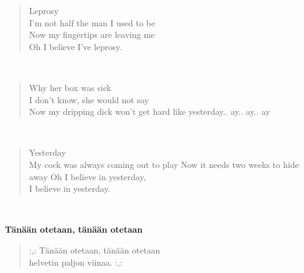 \noindent\begin{minipage}{\linewidth}
\begin{verse}
	Leprosy\\
	I'm not half the man I used to be\\
	Now my fingertips are leaving me\\
	Oh I believe I've leprosy.\\
\end{verse}
\end{minipage}\\[10pt]
\noindent\begin{minipage}{\linewidth}
\begin{verse}
	Why her box was sick\\
	I don't know, she would not say\\
	Now my dripping dick won't get hard like yesterday.. ay.. ay.. ay\\
\end{verse}
\end{minipage}\\[10pt]
\noindent\begin{minipage}{\linewidth}
\begin{verse}
	Yesterday\\
	My cock was always coming out to play Now it needs two weeks to hide away Oh I believe in yesterday,\\
	I believe in yesterday.\\
\end{verse}
\end{minipage}\\[10pt]
%
%
\noindent\begin{minipage}{\linewidth}
\vspace{5pt}
\parbox[t]{0.85\linewidth}{\raggedright {\large\bf Tänään otetaan, tänään otetaan}\\[6pt]}
\begin{verse}
	\hspace{0pt-\widthof{:,: }}:,: Tänään otetaan, tänään otetaan\\
	helvetin paljon viinaa. :,:\\
\end{verse}
\end{minipage}\\[10pt]
